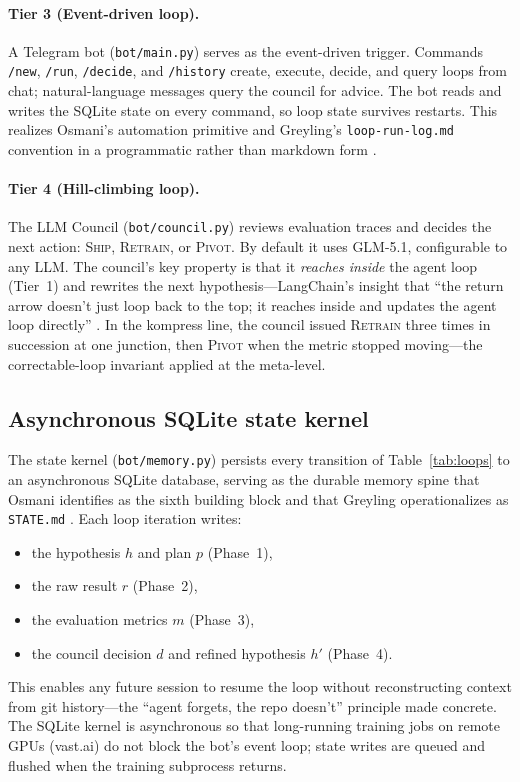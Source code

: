 \paragraph{Tier 3 (Event-driven loop).} A Telegram bot
(\texttt{bot/main.py}) serves as the event-driven trigger. Commands
\texttt{/new}, \texttt{/run}, \texttt{/decide}, and \texttt{/history}
create, execute, decide, and query loops from chat; natural-language
messages query the council for advice. The bot reads and writes the SQLite
state on every command, so loop state survives restarts. This realizes
Osmani's automation primitive and Greyling's \texttt{loop-run-log.md}
convention in a programmatic rather than markdown form
\citep{greyling2026loop}.

\paragraph{Tier 4 (Hill-climbing loop).} The LLM Council
(\texttt{bot/council.py}) reviews evaluation traces and decides the next
action: \textsc{Ship}, \textsc{Retrain}, or \textsc{Pivot}. By default it
uses GLM-5.1, configurable to any LLM. The council's key property is that
it \emph{reaches inside} the agent loop (Tier~1) and rewrites the next
hypothesis---LangChain's insight that ``the return arrow doesn't just loop
back to the top; it reaches inside and updates the agent loop directly''
\citep{langchain2026loops}. In the kompress line, the council issued
\textsc{Retrain} three times in succession at one junction, then
\textsc{Pivot} when the metric stopped moving---the correctable-loop
invariant applied at the meta-level.

\subsection{Asynchronous SQLite state kernel}
\label{sec:loopkit:sqlite}

The state kernel (\texttt{bot/memory.py}) persists every transition of
Table~\ref{tab:loops} to an asynchronous SQLite database, serving as the
durable memory spine that Osmani identifies as the sixth building block
\citep{osmani2026loop} and that Greyling operationalizes as
\texttt{STATE.md} \citep{greyling2026loop}. Each loop iteration writes:
\begin{itemize}
  \item the hypothesis $h$ and plan $p$ (Phase~1),
  \item the raw result $r$ (Phase~2),
  \item the evaluation metrics $m$ (Phase~3),
  \item the council decision $d$ and refined hypothesis $h'$ (Phase~4).
\end{itemize}
This enables any future session to resume the loop without reconstructing
context from git history---the ``agent forgets, the repo doesn't'' principle
made concrete. The SQLite kernel is asynchronous so that long-running
training jobs on remote GPUs (vast.ai) do not block the bot's event loop;
state writes are queued and flushed when the training subprocess returns.

